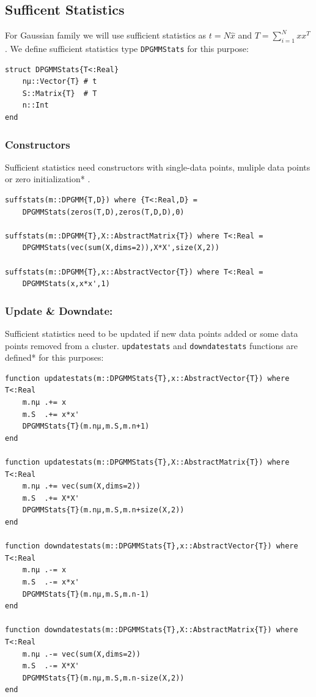 \documentclass[a4paper]{article}
\begin{document}
\subsection{Sufficent Statistics}

For Gaussian family we will use sufficient statistics as \(t =N\hat{x}\)
and \(T=\sum_{i=1}^Nxx^T\) . We define sufficient statistics type
\texttt{DPGMMStats} for this purpose:


\begin{lstlisting}[linewidth=8cm]
struct DPGMMStats{T<:Real}
    nμ::Vector{T} # t
    S::Matrix{T}  # T
    n::Int
end
\end{lstlisting}

\subsubsection{Constructors}

Sufficient statistics need constructors with single-data points, muliple
data points or zero initialization* .
\begin{lstlisting}[linewidth=13cm]
suffstats(m::DPGMM{T,D}) where {T<:Real,D} =
    DPGMMStats(zeros(T,D),zeros(T,D,D),0)

suffstats(m::DPGMM{T},X::AbstractMatrix{T}) where T<:Real =
    DPGMMStats(vec(sum(X,dims=2)),X*X',size(X,2))

suffstats(m::DPGMM{T},x::AbstractVector{T}) where T<:Real =
    DPGMMStats(x,x*x',1)
\end{lstlisting}


\subsubsection{Update \& Downdate:}

Sufficient statistics need to be updated if new data points added or
some data points removed from a cluster. \texttt{updatestats} and
\texttt{downdatestats} functions are defined* for this purposes:

\begin{lstlisting}
function updatestats(m::DPGMMStats{T},x::AbstractVector{T}) where T<:Real
    m.nμ .+= x
    m.S  .+= x*x'
    DPGMMStats{T}(m.nμ,m.S,m.n+1)
end

function updatestats(m::DPGMMStats{T},X::AbstractMatrix{T}) where T<:Real
    m.nμ .+= vec(sum(X,dims=2))
    m.S  .+= X*X'
    DPGMMStats{T}(m.nμ,m.S,m.n+size(X,2))
end

function downdatestats(m::DPGMMStats{T},x::AbstractVector{T}) where T<:Real
    m.nμ .-= x
    m.S  .-= x*x'
    DPGMMStats{T}(m.nμ,m.S,m.n-1)
end

function downdatestats(m::DPGMMStats{T},X::AbstractMatrix{T}) where T<:Real
    m.nμ .-= vec(sum(X,dims=2))
    m.S  .-= X*X'
    DPGMMStats{T}(m.nμ,m.S,m.n-size(X,2))
end
\end{lstlisting}
\end{document}
